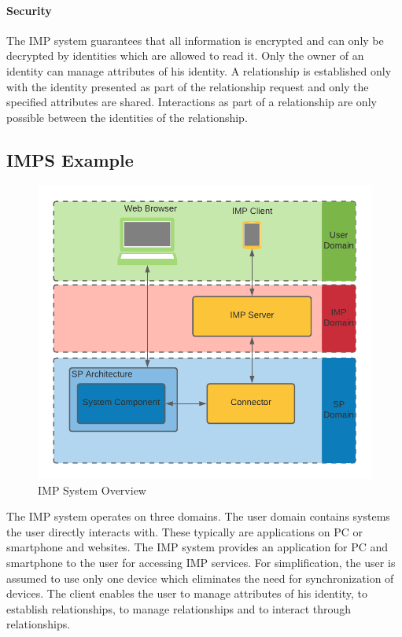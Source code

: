 \paragraph{Security}
The IMP system guarantees that all information is encrypted and can only be decrypted by identities which are allowed to read it. Only the owner of an identity can manage attributes of his identity. A relationship is established only with the identity presented as part of the relationship request and only the specified attributes are shared. Interactions as part of a relationship are only possible between the identities of the relationship. 

\subsection{IMPS Example}

\begin{figure}[h]
\caption{IMP System Overview}
    \centering
    \includegraphics[scale=0.25]{Diagrams/IMP System Overview.png}
\end{figure}

The IMP system operates on three domains. The user domain contains systems the user directly interacts with. These typically are applications on PC or smartphone and websites. The IMP system provides an application for PC and smartphone to the user for accessing IMP services. For simplification, the user is assumed to use only one device which eliminates the need for synchronization of devices. The client enables the user to manage attributes of his identity, to establish relationships, to manage relationships and to interact through relationships. 


